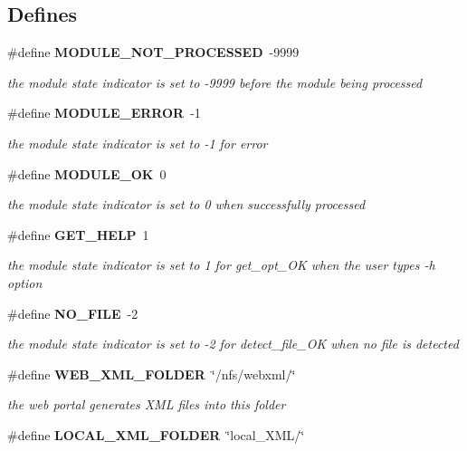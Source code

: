 \subsection*{Defines}
\begin{CompactItemize}
\item 
\#define {\bf MODULE\_\-NOT\_\-PROCESSED}~-9999
\begin{CompactList}\small\item\em the module state indicator is set to -9999 before the module being processed \item\end{CompactList}\item 
\#define {\bf MODULE\_\-ERROR}~-1
\begin{CompactList}\small\item\em the module state indicator is set to -1 for error \item\end{CompactList}\item 
\#define {\bf MODULE\_\-OK}~0
\begin{CompactList}\small\item\em the module state indicator is set to 0 when successfully processed \item\end{CompactList}\item 
\#define {\bf GET\_\-HELP}~1
\begin{CompactList}\small\item\em the module state indicator is set to 1 for get\_\-opt\_\-OK when the user types -h option \item\end{CompactList}\item 
\#define {\bf NO\_\-FILE}~-2
\begin{CompactList}\small\item\em the module state indicator is set to -2 for detect\_\-file\_\-OK when no file is detected \item\end{CompactList}\item 
\#define {\bf WEB\_\-XML\_\-FOLDER}~\char`\"{}/nfs/webxml/\char`\"{}
\begin{CompactList}\small\item\em the web portal generates XML files into this folder \item\end{CompactList}\item 
\#define {\bf LOCAL\_\-XML\_\-FOLDER}~\char`\"{}local\_\-XML/\char`\"{}

\end{CompactItemize}
